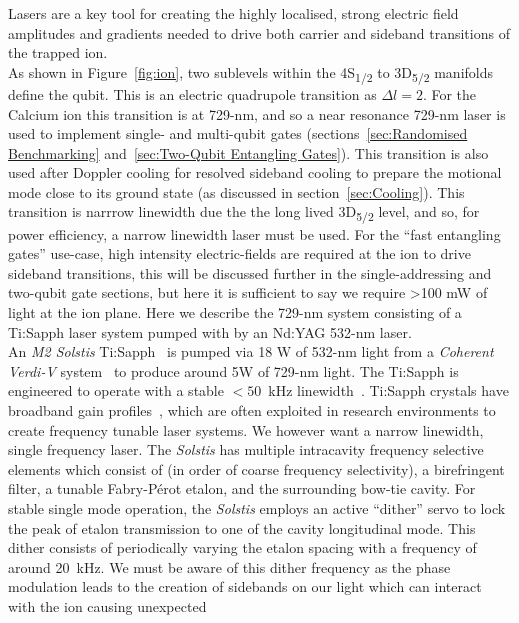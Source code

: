     Lasers are a key tool for creating the highly localised, strong electric
    field amplitudes and gradients needed to drive both carrier and sideband
    transitions of the trapped ion.\\ As shown in Figure~\ref{fig:ion}, 
    two sublevels within the 4S\textsubscript{1/2} to 3D\textsubscript{5/2}
    manifolds define the qubit. This is an electric quadrupole transition as
    $\Delta l = 2$.  For the Calcium ion this transition is at 729-nm, and so 
    a near resonance 729-nm laser is used to implement single- and multi-qubit gates
    (sections~\ref{sec:Randomised Benchmarking} and~\ref{sec:Two-Qubit
    Entangling Gates}). This transition is also used after Doppler cooling for
    resolved sideband cooling to prepare the motional mode close to its ground
    state (as discussed in section~\ref{sec:Cooling}).
    This transition is narrrow linewidth due the the long lived
    3D\textsubscript{5/2} level, and so, for power efficiency, a
    narrow linewidth laser must be used. For the ``fast entangling gates'' use-case, high intensity electric-fields are required at the ion to drive sideband
    transitions, this will be discussed further in the single-addressing and
    two-qubit gate sections, but here it is sufficient to say we require >100 mW
    of light at the ion plane.  Here we describe the 729-nm system 
    consisting of a Ti:Sapph laser system pumped with by an Nd:YAG 532-nm laser.\\
    An \emph{M2 Solstis} Ti:Sapph~\cite{} is pumped via 18 W of 532-nm light
    from a \emph{Coherent Verdi-V} system~\cite{} to produce around 5W of
    729-nm light.  The Ti:Sapph is engineered to operate with a stable $<50$~kHz
    linewidth~\cite{}. Ti:Sapph crystals have broadband gain profiles~\cite{}, which
    are often exploited in research environments to create frequency tunable
    laser systems. We however want a narrow linewidth, single frequency laser.
    The \emph{Solstis} has multiple intracavity frequency selective
    elements which consist of (in order of coarse frequency selectivity), a
    birefringent filter, a tunable Fabry-P\'erot etalon, and the surrounding
    bow-tie cavity. For stable single mode operation, the \emph{Solstis} employs
    an active ``dither'' servo to lock the peak of etalon transmission to one of
    the cavity longitudinal mode. This dither consists of periodically varying
    the etalon spacing with a frequency of around 20~kHz. We must be aware of
    this dither frequency as the phase modulation leads to the creation of
    sidebands on our light which can interact with the ion causing unexpected
